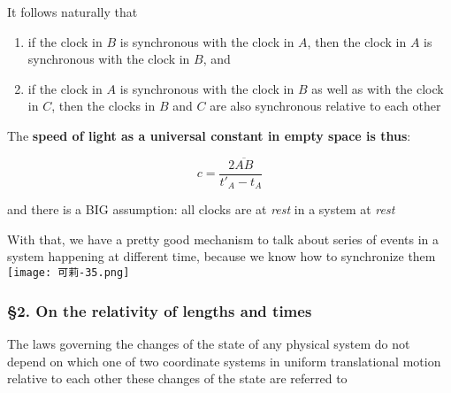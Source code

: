 It follows naturally that

\begin{enumerate}
    \item if the clock in $B$ is synchronous with the clock in $A$, then the clock in $A$ is synchronous with the clock
          in $B$, and
    \item if the clock in $A$ is synchronous with the clock in $B$ as well as with the clock in $C$, then the clocks in
          $B$ and $C$ are also synchronous relative to each other
\end{enumerate}

The \textbf{speed of light as a universal constant in empty space is thus}:

\begin{tcolorbox}[enhanced,colframe=green!75!black,colback=green!5!white]
    \begin{equation}
        c = \frac{2\overline{AB}}{t'_A - t_A}
    \end{equation}
\end{tcolorbox}

\begin{marker}
    and there is a BIG assumption: all clocks are at \textit{rest} in a system at \textit{rest}
\end{marker}

With that, we have a pretty good mechanism to talk about series of events in a system happening at different time,
because we know how to synchronize them \texttt{[image: 可莉-35.png]}

\subsubsection{\hfil \S2. On the relativity of lengths and times \hfil}

\begin{tcolorbox}[
    enhanced,
    title=Principle of Relativity,
    colframe=green!50!black,
    colback=green!10!white,
    arc=0mm,
    colbacktitle=red!10!white,
    coltitle=green!50!black,
    attach boxed title to top text right={yshift=-0.50mm},
    boxed title style={
        skin=enhancedfirst jigsaw,
        size=small,arc=1mm,bottom=-1mm,
        interior style={fill=none, top color=green!30!white, bottom color=green!20!white}
    }
]
    The laws governing the changes of the state of any physical system do not depend on which one of two coordinate
    systems in uniform translational motion relative to each other these changes of the state are referred to
\end{tcolorbox}

